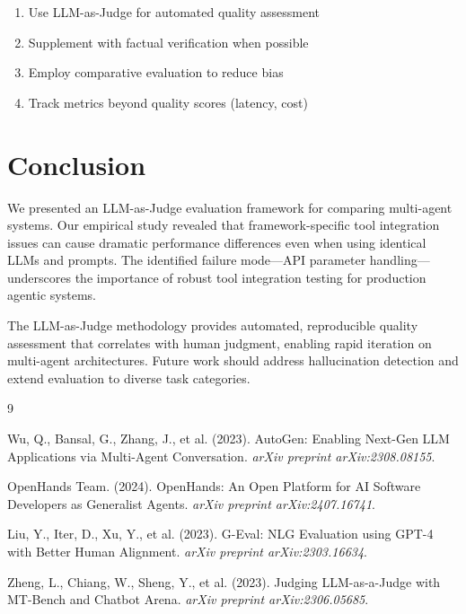 \documentclass[11pt,a4paper]{article}
\begin{document}
\begin{enumerate}
    \item Use LLM-as-Judge for automated quality assessment
    \item Supplement with factual verification when possible
    \item Employ comparative evaluation to reduce bias
    \item Track metrics beyond quality scores (latency, cost)
\end{enumerate}

\section{Conclusion}

We presented an LLM-as-Judge evaluation framework for comparing multi-agent systems. Our empirical study revealed that framework-specific tool integration issues can cause dramatic performance differences even when using identical LLMs and prompts. The identified failure mode---API parameter handling---underscores the importance of robust tool integration testing for production agentic systems.

The LLM-as-Judge methodology provides automated, reproducible quality assessment that correlates with human judgment, enabling rapid iteration on multi-agent architectures. Future work should address hallucination detection and extend evaluation to diverse task categories.


\begin{thebibliography}{9}

Wu, Q., Bansal, G., Zhang, J., et al. (2023).
\newblock AutoGen: Enabling Next-Gen LLM Applications via Multi-Agent Conversation.
\newblock \textit{arXiv preprint arXiv:2308.08155}.

OpenHands Team. (2024).
\newblock OpenHands: An Open Platform for AI Software Developers as Generalist Agents.
\newblock \textit{arXiv preprint arXiv:2407.16741}.

Liu, Y., Iter, D., Xu, Y., et al. (2023).
\newblock G-Eval: NLG Evaluation using GPT-4 with Better Human Alignment.
\newblock \textit{arXiv preprint arXiv:2303.16634}.

Zheng, L., Chiang, W., Sheng, Y., et al. (2023).
\newblock Judging LLM-as-a-Judge with MT-Bench and Chatbot Arena.
\newblock \textit{arXiv preprint arXiv:2306.05685}.

\end{thebibliography}
\end{document}
